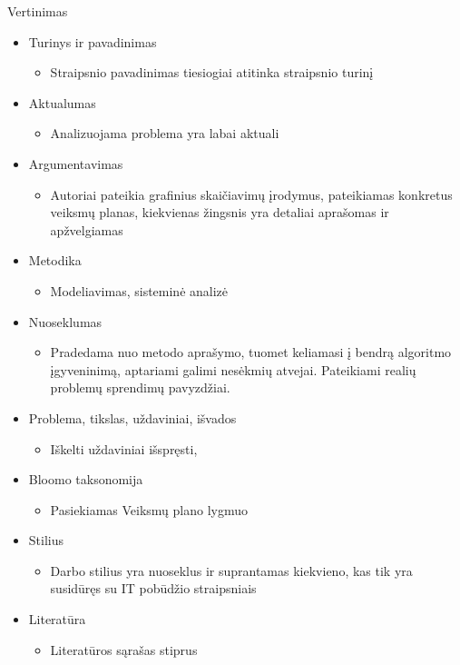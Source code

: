 \documentclass{beamer}
\begin{document}
  \begin{frame}[allowframebreaks=0.8]{Vertinimas}

    \begin{itemize}
      \item Turinys ir pavadinimas
        \begin{itemize}
          \item Straipsnio pavadinimas tiesiogiai atitinka straipsnio turinį
        \end{itemize}
      \item Aktualumas
        \begin{itemize}
          \item Analizuojama problema yra labai aktuali
        \end{itemize}
      \item Argumentavimas
        \begin{itemize}
          \item Autoriai pateikia grafinius skaičiavimų įrodymus, pateikiamas konkretus veiksmų planas, kiekvienas žingsnis yra detaliai aprašomas ir apžvelgiamas
        \end{itemize}
      \item Metodika
        \begin{itemize}
          \item Modeliavimas, sisteminė analizė
        \end{itemize}
      \item Nuoseklumas
        \begin{itemize}
          \item Pradedama nuo metodo aprašymo, tuomet keliamasi į bendrą algoritmo įgyveninimą, aptariami galimi nesėkmių atvejai. Pateikiami realių problemų sprendimų pavyzdžiai.
        \end{itemize}
      \item Problema, tikslas, uždaviniai, išvados
        \begin{itemize}
          \item Iškelti uždaviniai išspręsti, 
        \end{itemize}
      \item Bloomo taksonomija
        \begin{itemize}
          \item Pasiekiamas Veiksmų plano lygmuo
        \end{itemize}
      \item Stilius
        \begin{itemize}
          \item Darbo stilius yra nuoseklus ir suprantamas kiekvieno, kas tik yra susidūręs su IT pobūdžio straipsniais
        \end{itemize}
      \item Literatūra
        \begin{itemize}
          \item Literatūros sąrašas stiprus
        \end{itemize}
    \end{itemize}

  \end{frame}
\end{document}
